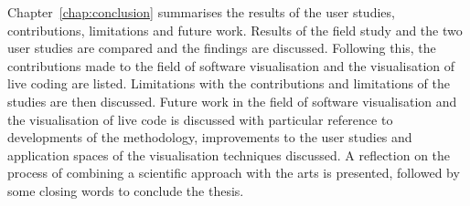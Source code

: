 Chapter~\ref{chap:conclusion} summarises the results of the user studies, contributions, limitations and future work. Results of the field study and the two user studies are compared and the findings are discussed. Following this, the contributions made to the field of software visualisation and the visualisation of live coding are listed. Limitations with the contributions and limitations of the studies are then discussed. Future work in the field of software visualisation and the visualisation of live code is discussed with particular reference to developments of the methodology, improvements to the user studies and application spaces of the visualisation techniques discussed. A reflection on the process of combining a scientific approach with the arts is presented, followed by some closing words to conclude the thesis.


